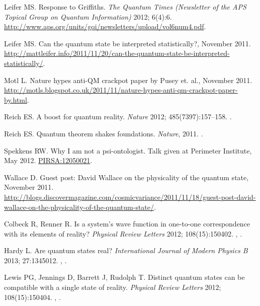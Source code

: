 \documentclass[DIV=calc,fontsize=12pt]{scrartcl} %
\theoremstyle{definition}
\theoremstyle{plain}
\begin{document}
\begin{thebibliography}{10}
Leifer MS.
\newblock Response to Griffiths.
\newblock \emph{The Quantum Times (Newsletter of the APS Topical Group on
Quantum Information)} 2012; 6(4):6.
\newblock \url{http://www.aps.org/units/gqi/newsletters/upload/vol6num4.pdf}.

Leifer MS.
\newblock Can the quantum state be interpreted statistically?, November 2011.
\newblock \url{http://mattleifer.info/2011/11/20/can-the-quantum-state-be-interpreted-statistically/}.

Motl L.
\newblock Nature hypes anti-QM crackpot paper by Pusey et. al., November 2011.
\newblock \url{http://motls.blogspot.co.uk/2011/11/nature-hypes-anti-qm-crackpot-paper-by.html}.

Reich ES.
\newblock A boost for quantum reality.
\newblock \emph{Nature} 2012; 485(7397):157--158.
\newblock \href {http://dx.doi.org/10.1038/485157a}
{}.

Reich ES.
\newblock Quantum theorem shakes foundations.
\newblock \emph{Nature}, 2011.
\newblock \href {http://dx.doi.org/10.1038/nature.2011.9392}
{}.

Spekkens RW.
\newblock Why I am not a psi-ontologist.
\newblock Talk given at Perimeter Institute, May 2012.
\newblock \href{http://pirsa.org/12050021/}{PIRSA:12050021}.

Wallace D.
\newblock Guest post: David Wallace on the physicality of the quantum state, November 2011.
\newblock \url{http://blogs.discovermagazine.com/cosmicvariance/2011/11/18/guest-post-david-wallace-on-the-physicality-of-the-quantum-state/}.

Colbeck R, Renner R.
\newblock Is a system's wave function in one-to-one correspondence with its
elements of reality?
\newblock \emph{Physical Review Letters} 2012; 108(15):150402.
\newblock \href {http://arxiv.org/abs/1111.6597} {},
\href {http://dx.doi.org/10.1103/PhysRevLett.108.150402}
{}.

Hardy L.
\newblock Are quantum states real?
\newblock \emph{International Journal of Modern Physics B} 2013; 27:1345012.
\newblock \href {http://arxiv.org/abs/1205.1439} {},
\href {http://dx.doi.org/10.1142/S0217979213450124}
{}.

Lewis PG, Jennings D, Barrett J, Rudolph T.
\newblock Distinct quantum states can be compatible with a single state of
reality.
\newblock \emph{Physical Review Letters} 2012; 108(15):150404.
\newblock \href {http://arxiv.org/abs/1201.6554} {},
\href {http://dx.doi.org/10.1103/PhysRevLett.109.150404}
{}.


\end{thebibliography}
\end{document}
